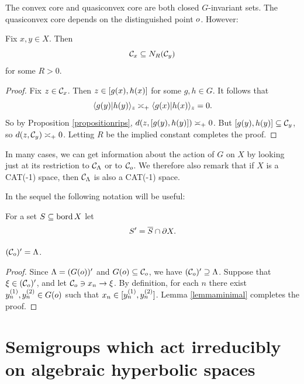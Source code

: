 \begin{observation}
The convex core and quasiconvex core are both closed $G$-invariant sets. The quasiconvex core depends on the distinguished point $o$. However:
\end{observation}

\begin{proposition}
\label{propositionC0comparison}
Fix $x,y\in X$. Then
\[
\mathcal C_x \subseteq N_R(\mathcal C_y)
\]
for some $R > 0$.
\end{proposition}
\begin{proof}
Fix $z\in\mathcal C_x$. Then $z\in [g(x),h(x)]$ for some $g,h\in G$. It follows that
\[
\langle g(y)|h(y)\rangle_z \asymp_+ \langle g(x)|h(x)\rangle_z = 0.
\]
So by Proposition \ref{propositionrips}, $d(z,[g(y),h(y)]) \asymp_+ 0$. But $[g(y),h(y)] \subseteq \mathcal C_y$, so $d(z,\mathcal C_y) \asymp_+ 0$. Letting $R$ be the implied constant completes the proof.
\end{proof}

\begin{remark}
In many cases, we can get information about the action of $G$ on $X$ by looking just at its restriction to $\mathcal C_\Lambda$ or to $\mathcal C_o$. We therefore also remark that if $X$ is a CAT(-1) space, then $\mathcal C_\Lambda$ is also a CAT(-1) space.
\end{remark}

In the sequel the following notation will be useful:
\begin{notation}
For a set $S\subseteq\operatorname{bord} X$ let
\begin{equation}
\label{primenotation}
S' = \overline S \cap \partial X.
\end{equation}
\end{notation}

\begin{observation}
\label{observationboundaryofconvexcore}
$(\mathcal C_o)' = \Lambda$.
\end{observation}
\begin{proof}
Since $\Lambda = (G(o))'$ and $G(o) \subseteq\mathcal C_o$, we have $(\mathcal C_o)' \supseteq \Lambda$. Suppose that $\xi\in(\mathcal C_o)'$, and let $\mathcal C_o\ni x_n\to \xi$. By definition, for each $n$ there exist $y_n^{(1)},y_n^{(2)}\in G(o)$ such that $x_n\in [y_n^{(1)},y_n^{(2)}]$. Lemma \ref{lemmaminimal} completes the proof.
\end{proof}

\bigskip
\section{Semigroups which act irreducibly on algebraic hyperbolic spaces}
\label{subsectionirreducibly}

